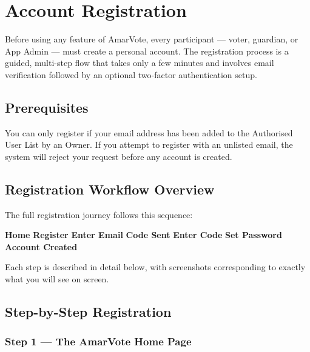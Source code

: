 \documentclass[12pt,a4paper,openany]{book}
\begin{document}
\chapter{Account Registration}
\label{ch:registration}

Before using any feature of AmarVote, every participant --- voter, guardian, or App Admin --- must create a personal account. The registration process is a guided, multi-step flow that takes only a few minutes and involves email verification followed by an optional two-factor authentication setup.

\section{Prerequisites}

\begin{tcolorbox}[warnbox]
	You can only register if your email address has been added to the Authorised User List by an Owner. If you attempt to register with an unlisted email, the system will reject your request before any account is created.
\end{tcolorbox}

\section{Registration Workflow Overview}

The full registration journey follows this sequence:

\begin{center}
	\textbf{Home} \;\faArrowRight\; \textbf{Register} \;\faArrowRight\; \textbf{Enter Email} \;\faArrowRight\; \textbf{Code Sent} \;\faArrowRight\; \textbf{Enter Code} \;\faArrowRight\; \textbf{Set Password} \;\faArrowRight\; \textbf{Account Created}
\end{center}

Each step is described in detail below, with screenshots corresponding to exactly what you will see on screen.

\section{Step-by-Step Registration}

\subsection{Step 1 --- The AmarVote Home Page}
\end{document}
